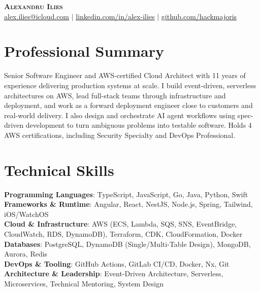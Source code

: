 \documentclass[letterpaper,10pt]{article}
\begin{document}
\begin{center}
    \textbf{\Huge \scshape Alexandru Ilies} \\ \vspace{0.7pt}
    \href{mailto:alex.ilies@icloud.com}{\underline{alex.ilies@icloud.com}} $|$
    \href{https://alexilies.page.link/in}{\underline{linkedin.com/in/alex-ilies}} $|$
    \href{https://github.com/hackmajoris}{\underline{github.com/hackmajoris}}
\end{center}

\section{Professional Summary}
 \begin{itemize}[leftmargin=0.15in, label={}]
    \small{\item{{Senior Software Engineer and AWS-certified Cloud Architect with 11 years of experience delivering production systems at scale. I build event-driven, serverless architectures on AWS, lead full-stack teams through infrastructure and deployment, and work as a forward deployment engineer close to customers and real-world delivery. I also design and orchestrate AI agent workflows using spec-driven development to turn ambiguous problems into testable software. Holds 4 AWS certifications, including Security Specialty and DevOps Professional.}}}
 \end{itemize}

\section{Technical Skills}
 \begin{itemize}[leftmargin=0.15in, label={}]
    \small{\item{
     \textbf{Programming Languages}{: TypeScript, JavaScript, Go, Java, Python, Swift} \\
     \textbf{Frameworks \& Runtime}{: Angular, React, NestJS, Node.js, Spring, Tailwind, iOS/WatchOS} \\
     \textbf{Cloud \& Infrastructure}{: AWS (ECS, Lambda, SQS, SNS, EventBridge, CloudWatch, RDS, DynamoDB), Terraform, CDK, CloudFormation, Docker} \\
     \textbf{Databases}{: PostgreSQL, DynamoDB (Single/Multi-Table Design), MongoDB, Aurora, Redis} \\
     \textbf{DevOps \& Tooling}{: GitHub Actions, GitLab CI/CD, Docker, Nx, Git} \\
     \textbf{Architecture \& Leadership}{: Event-Driven Architecture, Serverless, Microservices, Technical Mentoring, System Design}
     }}
 \end{itemize}
\end{document}
